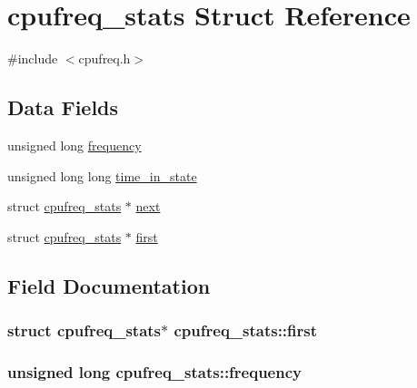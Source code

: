 \hypertarget{structcpufreq__stats}{}\section{cpufreq\+\_\+stats Struct Reference}
\label{structcpufreq__stats}


{\ttfamily \#include $<$cpufreq.\+h$>$}

\subsection*{Data Fields}
\begin{DoxyCompactItemize}
\item 
unsigned long \hyperlink{structcpufreq__stats_a387ccb433c26f2b249454f0a9913d033}{frequency}
\item 
unsigned long long \hyperlink{structcpufreq__stats_a827f8ecb018a53dbb53c883d17a9f944}{time\+\_\+in\+\_\+state}
\item 
struct \hyperlink{structcpufreq__stats}{cpufreq\+\_\+stats} $\ast$ \hyperlink{structcpufreq__stats_ab414c3188af3d1b94333137a0790b945}{next}
\item 
struct \hyperlink{structcpufreq__stats}{cpufreq\+\_\+stats} $\ast$ \hyperlink{structcpufreq__stats_ad86cafc85cfd0f15b184ac6a46259d05}{first}
\end{DoxyCompactItemize}


\subsection{Field Documentation}
\subsubsection[{\texorpdfstring{first}{first}}]{\setlength{\rightskip}{0pt plus 5cm}struct {\bf cpufreq\+\_\+stats}$\ast$ cpufreq\+\_\+stats\+::first}\hypertarget{structcpufreq__stats_ad86cafc85cfd0f15b184ac6a46259d05}{}\label{structcpufreq__stats_ad86cafc85cfd0f15b184ac6a46259d05}
\subsubsection[{\texorpdfstring{frequency}{frequency}}]{\setlength{\rightskip}{0pt plus 5cm}unsigned long cpufreq\+\_\+stats\+::frequency}\hypertarget{structcpufreq__stats_a387ccb433c26f2b249454f0a9913d033}{}\label{structcpufreq__stats_a387ccb433c26f2b249454f0a9913d033}
